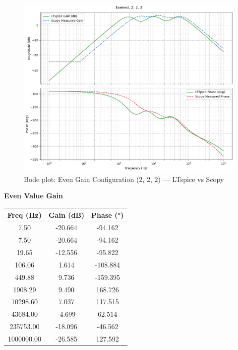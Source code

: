 \documentclass[12pt]{article}
\begin{document}
\begin{figure}[H]
	\centering
	\includegraphics[width=\textwidth]{dp2even.png}
	\caption{Bode plot: Even Gain Configuration (2, 2, 2) — LTspice vs Scopy}
	\label{fig:evenvalue}
\end{figure}

\noindent\textbf{Even Value Gain}
\begin{center}
	\begin{tabular}{|c|c|c|}
		\hline
		\textbf{Freq (Hz)} & \textbf{Gain (dB)} & \textbf{Phase (°)} \\
		\hline
		7.50               & -20.664            & -94.162            \\
		7.50               & -20.664            & -94.162            \\
		19.65              & -12.556            & -95.822            \\
		106.06             & 1.614              & -108.884           \\
		449.88             & 9.736              & -159.395           \\
		1908.29            & 9.490              & 168.726            \\
		10298.60           & 7.037              & 117.515            \\
		43684.00           & -4.699             & 62.514             \\
		235753.00          & -18.096            & -46.562            \\
		1000000.00         & -26.585            & 127.592            \\
		\hline
	\end{tabular}
\end{center}
\end{document}
